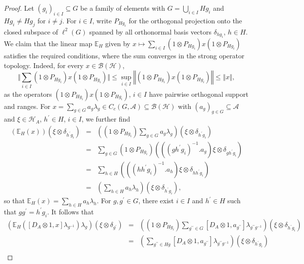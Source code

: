 \documentclass[a4paper,11pt,reqno]{amsart}
\numberwithin{equation}{section}
\numberwithin{equation}{section}
\theoremstyle{definition}
\theoremstyle{remark}
\theoremstyle{remark}
\begin{document}
\begin{proof} Let $(g_{i})_{i\in I}\subseteq G$ be a family of elements
with $G=\bigcup_{i\in I}Hg_{i}$ and $Hg_{i}\neq Hg_{j}$ for $i\neq j$.
For $i\in I$, write $P_{Hg_{i}}$ for the orthogonal projection onto
the closed subspace of $\ell^{2}(G)$ spanned by all orthonormal basis
vectors $\delta_{hg_{i}}$, $h\in H$. We claim that the linear map
$\mathbb{E}_{H}$ given by $x\mapsto\sum_{i\in I}(1\otimes P_{Hg_{i}})x(1\otimes P_{Hg_{i}})$
satisfies the required conditions, where the sum converges in the strong
operator topology. Indeed, for every $x\in\mathcal{B}(\mathcal{H})$,
\[
\Vert\sum_{i\in I}(1\otimes P_{Hg_{i}})x(1\otimes P_{Hg_{i}})\Vert\leq\sup_{i\in I}\left\Vert (1\otimes P_{Hg_{i}})x(1\otimes P_{Hg_{i}})\right\Vert \leq\left\Vert x\right\Vert ,
\]
as the operators $(1\otimes P_{Hg_{i}})x(1\otimes P_{Hg_{i}})$, $i\in I$
have pairwise orthogonal support and ranges. For $x=\sum_{g\in G}a_{g}\lambda_{g}\in C_{c}(G,\mathcal{A})\subseteq\mathcal{B}(\mathcal{H})$
with $(a_{g})_{g\in G}\subseteq\mathcal{A}$ and $\xi\in\mathcal{H}_{A}$,
$h^{\prime}\in H$, $i\in I$, we further find 
\begin{eqnarray}
\nonumber
\left(\mathbb{E}_{H}(x)\right)(\xi\otimes\delta_{h^{\prime}g_{i}}) &=& ((1\otimes P_{Hg_{i}})\sum_{g\in G}a_{g}\lambda_{g})(\xi\otimes\delta_{h^{\prime}g_{i}}) \\
\nonumber
&=& \sum_{g\in G}(1\otimes P_{Hg_{i}})\left(((gh^{\prime}g_{i})^{-1}.a_{g})\xi\otimes\delta_{gh^{\prime}g_{i}}\right) \\
\nonumber
&=& \sum_{h\in H}\left(((hh^{\prime}g_{i})^{-1}.a_{h})\xi\otimes\delta_{hh^{\prime}g_{i}}\right) \\
\nonumber
&=& (\sum_{h\in H}a_{h}\lambda_{h})(\xi\otimes\delta_{h^{\prime}g_{i}}),
\end{eqnarray}
so that $\mathbb{E}_{H}(x)=\sum_{h\in H}a_{h}\lambda_{h}$. For $g,g^{\prime}\in G$,
there exist $i\in I$ and $h^{\prime}\in H$ such that $gg^{\prime}=h^{\prime}g_{i}$.
It follows that
\begin{eqnarray}
\nonumber
\left(\mathbb{E}_{H}([D_{A}\otimes1,x]\lambda_{g^{-1}})\lambda_{g}\right)(\xi\otimes\delta_{g^{\prime}}) &=& ((1\otimes P_{Hg_{i}})\sum_{g^{\prime\prime}\in G}[D_{A}\otimes1,a_{g^{\prime\prime}}]\lambda_{g^{\prime\prime}g^{-1}})(\xi\otimes\delta_{h^{\prime}g_{i}}) \\
\nonumber
&=& (\sum_{g^{\prime\prime}\in Hg}[D_{A}\otimes1,a_{g^{\prime\prime}}]\lambda_{g^{\prime\prime}g^{-1}})(\xi\otimes\delta_{h^{\prime}g_{i}}) \\

\end{eqnarray}
\end{proof}
\end{document}
